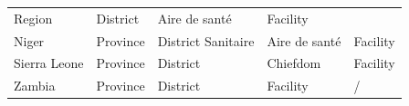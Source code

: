 \documentclass[]{book}
\begin{document}
\begin{longtable}[]{@{}lllll@{}}
\begin{minipage}[t]{0.20\columnwidth}
Region\strut
\end{minipage} & \begin{minipage}[t]{0.20\columnwidth}\raggedright
District\strut
\end{minipage} & \begin{minipage}[t]{0.20\columnwidth}\raggedright
Aire de santé\strut
\end{minipage} & \begin{minipage}[t]{0.20\columnwidth}\raggedright
Facility\strut
\end{minipage}\tabularnewline
\begin{minipage}[t]{0.07\columnwidth}\raggedright
Niger\strut
\end{minipage} & \begin{minipage}[t]{0.20\columnwidth}\raggedright
Province\strut
\end{minipage} & \begin{minipage}[t]{0.20\columnwidth}\raggedright
District Sanitaire\strut
\end{minipage} & \begin{minipage}[t]{0.20\columnwidth}\raggedright
Aire de santé\strut
\end{minipage} & \begin{minipage}[t]{0.20\columnwidth}\raggedright
Facility\strut
\end{minipage}\tabularnewline
\begin{minipage}[t]{0.07\columnwidth}\raggedright
Sierra Leone\strut
\end{minipage} & \begin{minipage}[t]{0.20\columnwidth}\raggedright
Province\strut
\end{minipage} & \begin{minipage}[t]{0.20\columnwidth}\raggedright
District\strut
\end{minipage} & \begin{minipage}[t]{0.20\columnwidth}\raggedright
Chiefdom\strut
\end{minipage} & \begin{minipage}[t]{0.20\columnwidth}\raggedright
Facility\strut
\end{minipage}\tabularnewline
\begin{minipage}[t]{0.07\columnwidth}\raggedright
Zambia\strut
\end{minipage} & \begin{minipage}[t]{0.20\columnwidth}\raggedright
Province\strut
\end{minipage} & \begin{minipage}[t]{0.20\columnwidth}\raggedright
District\strut
\end{minipage} & \begin{minipage}[t]{0.20\columnwidth}\raggedright
Facility\strut
\end{minipage} & \begin{minipage}[t]{0.20\columnwidth}\raggedright
/\strut
\end{minipage}\tabularnewline
\bottomrule
\end{longtable}
\end{document}
